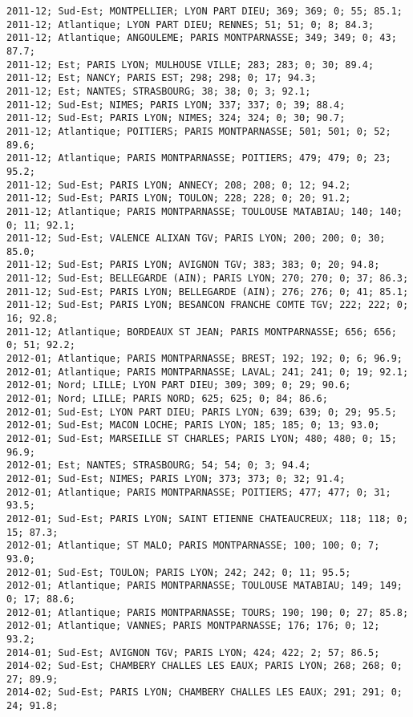 \documentclass{article}
\begin{document}
\begin{Verbatim}[commandchars=\\\{\}]
2011-12; Sud-Est; MONTPELLIER; LYON PART DIEU; 369; 369; 0; 55; 85.1; 
2011-12; Atlantique; LYON PART DIEU; RENNES; 51; 51; 0; 8; 84.3; 
2011-12; Atlantique; ANGOULEME; PARIS MONTPARNASSE; 349; 349; 0; 43; 87.7; 
2011-12; Est; PARIS LYON; MULHOUSE VILLE; 283; 283; 0; 30; 89.4; 
2011-12; Est; NANCY; PARIS EST; 298; 298; 0; 17; 94.3; 
2011-12; Est; NANTES; STRASBOURG; 38; 38; 0; 3; 92.1; 
2011-12; Sud-Est; NIMES; PARIS LYON; 337; 337; 0; 39; 88.4; 
2011-12; Sud-Est; PARIS LYON; NIMES; 324; 324; 0; 30; 90.7; 
2011-12; Atlantique; POITIERS; PARIS MONTPARNASSE; 501; 501; 0; 52; 89.6; 
2011-12; Atlantique; PARIS MONTPARNASSE; POITIERS; 479; 479; 0; 23; 95.2; 
2011-12; Sud-Est; PARIS LYON; ANNECY; 208; 208; 0; 12; 94.2; 
2011-12; Sud-Est; PARIS LYON; TOULON; 228; 228; 0; 20; 91.2; 
2011-12; Atlantique; PARIS MONTPARNASSE; TOULOUSE MATABIAU; 140; 140; 0; 11; 92.1; 
2011-12; Sud-Est; VALENCE ALIXAN TGV; PARIS LYON; 200; 200; 0; 30; 85.0; 
2011-12; Sud-Est; PARIS LYON; AVIGNON TGV; 383; 383; 0; 20; 94.8; 
2011-12; Sud-Est; BELLEGARDE (AIN); PARIS LYON; 270; 270; 0; 37; 86.3; 
2011-12; Sud-Est; PARIS LYON; BELLEGARDE (AIN); 276; 276; 0; 41; 85.1; 
2011-12; Sud-Est; PARIS LYON; BESANCON FRANCHE COMTE TGV; 222; 222; 0; 16; 92.8; 
2011-12; Atlantique; BORDEAUX ST JEAN; PARIS MONTPARNASSE; 656; 656; 0; 51; 92.2; 
2012-01; Atlantique; PARIS MONTPARNASSE; BREST; 192; 192; 0; 6; 96.9; 
2012-01; Atlantique; PARIS MONTPARNASSE; LAVAL; 241; 241; 0; 19; 92.1; 
2012-01; Nord; LILLE; LYON PART DIEU; 309; 309; 0; 29; 90.6; 
2012-01; Nord; LILLE; PARIS NORD; 625; 625; 0; 84; 86.6; 
2012-01; Sud-Est; LYON PART DIEU; PARIS LYON; 639; 639; 0; 29; 95.5; 
2012-01; Sud-Est; MACON LOCHE; PARIS LYON; 185; 185; 0; 13; 93.0; 
2012-01; Sud-Est; MARSEILLE ST CHARLES; PARIS LYON; 480; 480; 0; 15; 96.9; 
2012-01; Est; NANTES; STRASBOURG; 54; 54; 0; 3; 94.4; 
2012-01; Sud-Est; NIMES; PARIS LYON; 373; 373; 0; 32; 91.4; 
2012-01; Atlantique; PARIS MONTPARNASSE; POITIERS; 477; 477; 0; 31; 93.5; 
2012-01; Sud-Est; PARIS LYON; SAINT ETIENNE CHATEAUCREUX; 118; 118; 0; 15; 87.3; 
2012-01; Atlantique; ST MALO; PARIS MONTPARNASSE; 100; 100; 0; 7; 93.0; 
2012-01; Sud-Est; TOULON; PARIS LYON; 242; 242; 0; 11; 95.5; 
2012-01; Atlantique; PARIS MONTPARNASSE; TOULOUSE MATABIAU; 149; 149; 0; 17; 88.6; 
2012-01; Atlantique; PARIS MONTPARNASSE; TOURS; 190; 190; 0; 27; 85.8; 
2012-01; Atlantique; VANNES; PARIS MONTPARNASSE; 176; 176; 0; 12; 93.2; 
2014-01; Sud-Est; AVIGNON TGV; PARIS LYON; 424; 422; 2; 57; 86.5; 
2014-02; Sud-Est; CHAMBERY CHALLES LES EAUX; PARIS LYON; 268; 268; 0; 27; 89.9; 
2014-02; Sud-Est; PARIS LYON; CHAMBERY CHALLES LES EAUX; 291; 291; 0; 24; 91.8; 

\end{Verbatim}
\end{document}
